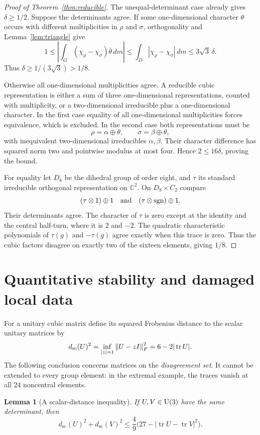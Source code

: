 \documentclass[11pt]{article}
\newtheorem{lemma}[theorem]{Lemma}
\theoremstyle{definition}\newtheorem{definition}[theorem]{Definition}
\theoremstyle{remark}\newtheorem{remark}[theorem]{Remark}
\newcommand{\C}{\mathbb C}\newcommand{\Q}{\mathbb Q}\newcommand{\F}{\mathbb F}\newcommand{\Z}{\mathbb Z}
\newcommand{\tr}{\operatorname{tr}}\newcommand{\Gal}{\operatorname{Gal}}\newcommand{\diag}{\operatorname{diag}}
\newcommand{\scal}{\mathrm{sc}}\newcommand{\dist}{\operatorname{dist}}\newcommand{\id}{\mathrm{id}}
\begin{document}
\begin{proof}[Proof of Theorem~\ref{thm:reducible}]
The unequal-determinant case already gives $\delta\ge1/2$. Suppose the determinants agree. If some one-dimensional character $\theta$ occurs with different multiplicities in $\rho$ and $\sigma$, orthogonality and Lemma~\ref{lem:triangle} give
\[
 1\le\left|\int_G(\chi_\rho-\chi_\sigma)\overline\theta\,dm\right|
 \le\int_D|\chi_\rho-\chi_\sigma|\,dm
 \le3\sqrt3\,\delta.
\]
Thus $\delta\ge1/(3\sqrt3)>1/8$.

Otherwise all one-dimensional multiplicities agree. A reducible cubic representation is either a sum of three one-dimensional representations, counted with multiplicity, or a two-dimensional irreducible plus a one-dimensional character. In the first case equality of all one-dimensional multiplicities forces equivalence, which is excluded. In the second case both representations must be
\[
 \rho=\alpha\oplus\theta,\qquad \sigma=\beta\oplus\theta,
\]
with inequivalent two-dimensional irreducibles $\alpha,\beta$. Their character difference has squared norm two and pointwise modulus at most four. Hence $2\le16\delta$, proving the bound.

For equality let $D_8$ be the dihedral group of order eight, and $\tau$ its standard irreducible orthogonal representation on $\C^2$. On $D_8\times C_2$ compare
\[
 (\tau\otimes1)\oplus1\quad\hbox{and}\quad(\tau\otimes\mathrm{sgn})\oplus1.
\]
Their determinants agree. The character of $\tau$ is zero except at the identity and the central half-turn, where it is $2$ and $-2$. The quadratic characteristic polynomials of $\tau(g)$ and $-\tau(g)$ agree exactly when this trace is zero. Thus the cubic factors disagree on exactly two of the sixteen elements, giving $1/8$.
\end{proof}

\section{Quantitative stability and damaged local data}

For a unitary cubic matrix define its squared Frobenius distance to the scalar unitary matrices by
\[
 d_{\scal}(U)^2=\inf_{|z|=1}\norm{U-zI}_{F}^{2}=6-2|\tr U|.
\]
The following conclusion concerns matrices on the \emph{disagreement set}. It cannot be extended to every group element: in the extremal example, the traces vanish at all $24$ noncentral elements.

\begin{lemma}[A scalar-distance inequality]\label{lem:stability}
If $U,V\in\mathrm U(3)$ have the same determinant, then
\begin{equation}\label{eq:stabilitypoint}
 d_{\scal}(U)^2+d_{\scal}(V)^2
 \le\frac49\bigl(27-|\tr U-\tr V|^2\bigr).
\end{equation}
\end{lemma}
\end{document}

